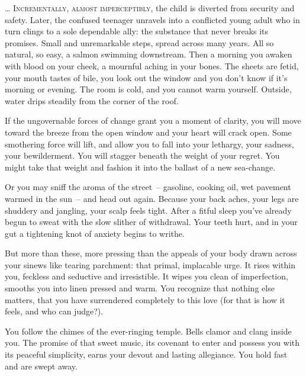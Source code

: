 \documentclass[10pt,DIV09,letterpaper,oneside,headsepline]{scrreprt}
\begin{document}
\ldots
\vspace{\baselineskip}
\lettrine[nindent=2pt]{\textcolor[gray]{0.1}{I}}{ncrementally, almost imperceptibly, }
the child is diverted from security and safety. Later, the confused teenager unravels into a conflicted young adult who in turn clings to a sole dependable ally: the substance that never breaks its promises. Small and unremarkable steps, spread across many years. All so natural, so easy, a salmon swimming downstream. Then a morning you awaken with blood on your cheek, a mournful aching in your bones. The sheets are fetid, your mouth tastes of bile, you look out the window and you don't know if it's morning or evening. The room is cold, and you cannot warm yourself. Outside, water drips steadily from the corner of the roof.

If the ungovernable forces of change grant you a moment of clarity, you will move toward the breeze from the open window and your heart will crack open. Some smothering force will lift, and allow you to fall into your lethargy, your sadness, your bewilderment. You will stagger beneath the weight of your regret. You might take that weight and fashion it into the ballast of a new sea-change.

Or you may sniff the aroma of the street~-- gasoline, cooking oil, wet pavement warmed in the sun~-- and head out again. Because your back aches, your legs are shuddery and jangling, your scalp feels tight. After a fitful sleep you've already begun to sweat with the slow slither of withdrawal. Your teeth hurt, and in your gut a tightening knot of anxiety begins to writhe.

But more than these, more pressing than the appeals of your body drawn across your sinews like tearing parchment: that primal, implacable urge. It rises within you, feckless and seductive and irresistible. It wipes you clean of imperfection, smooths you into linen pressed and warm. You recognize that nothing else matters, that you have surrendered completely to this love (for that is how it feels, and who can judge?).

You follow the chimes of the ever-ringing temple. Bells clamor and clang inside you. The promise of that sweet music, its covenant to enter and possess you with its peaceful simplicity, earns your devout and lasting allegiance. You hold fast and are swept away.
\end{document}

